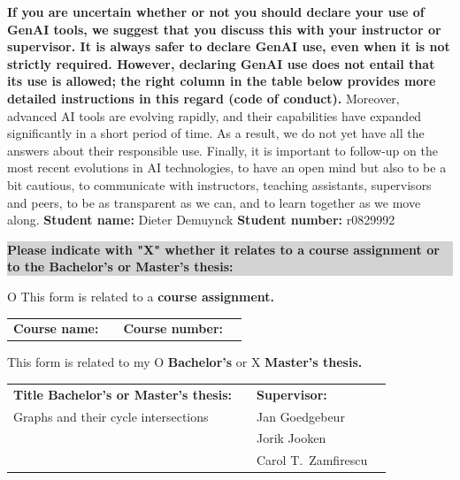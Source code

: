 \textbf{If you are uncertain whether or not you should declare your use of GenAI tools, we suggest that you discuss this with your instructor or supervisor. It is always safer to declare GenAI use, even when it is not strictly required. However, declaring GenAI use does not entail that its use is allowed; the right column in the table below provides more detailed instructions in this regard (code of conduct). }
\newline
\newline
Moreover, advanced AI tools are evolving rapidly, and their capabilities have expanded significantly in a short period of time. As a result, we do not yet have all the answers about their responsible use. Finally, it is important to follow-up on the most recent evolutions in AI technologies, to have an open mind but also to be a bit cautious, to communicate with instructors, teaching assistants, supervisors and peers, to be as transparent as we can, and to learn together as we move along.
\newpage
\noindent
\textbf{Student name:} Dieter Demuynck \hfill \textbf{Student number:} r0829992

\vspace{1em}

\noindent
\colorbox{lightgray}{\parbox{\dimexpr\linewidth-2\fboxsep\relax}{\textbf{Please indicate with "X" whether it relates to a course assignment or to the Bachelor’s or Master’s thesis:}}}

\vspace{1em}

O This form is related to a \textbf{course assignment.}

\begin{tabularx}{\linewidth}{@{}lXlX@{}}
\textbf{Course name:} & \dotfill & \textbf{Course number:} & \dotfill \\
\end{tabularx}

\vspace{1em}

This form is related to my O \textbf{Bachelor’s} or X \textbf{Master’s thesis.}

\begin{tabularx}{\linewidth}{@{}lXlX@{}}
\textbf{Title Bachelor’s or Master’s thesis:} & & \textbf{Supervisor:} & \\
Graphs and their cycle intersections & & Jan Goedgebeur &  \\
& & Jorik Jooken & \\
& & Carol T.\ Zamfirescu \\
\end{tabularx}

